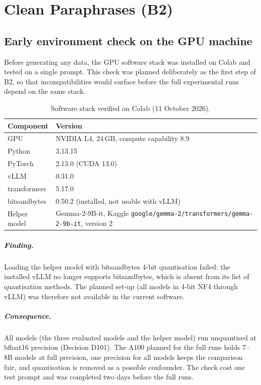\documentclass[11pt,a4paper]{report}
\begin{document}
\chapter{Clean Paraphrases (B2)}\label{ch:b2}

\section{Early environment check on the GPU machine}\label{sec:b2-envcheck}
Before generating any data, the GPU software stack was installed on Colab and
tested on a single prompt. This check was planned deliberately as the first
step of B2, so that incompatibilities would surface before the full
experimental runs depend on the same stack.

\begin{table}[h]
\centering\small
\begin{tabular}{@{}ll@{}}
\toprule
Component & Version \\
\midrule
GPU & NVIDIA L4, 24\,GB, compute capability 8.9 \\
Python & 3.13.15 \\
PyTorch & 2.13.0 (CUDA 13.0) \\
vLLM & 0.31.0 \\
transformers & 5.17.0 \\
bitsandbytes & 0.50.2 (installed, not usable with vLLM) \\
Helper model & Gemma-2-9B-it, Kaggle \texttt{google/gemma-2/transformers/gemma-2-9b-it}, version 2 \\
\bottomrule
\end{tabular}
\caption{Software stack verified on Colab (11 October 2026).}
\label{tab:b2-env}
\end{table}

\paragraph{Finding.}
Loading the helper model with bitsandbytes 4-bit quantisation failed: the
installed vLLM no longer supports bitsandbytes, which is absent from its list
of quantisation methods. The planned set-up (all models in 4-bit NF4 through
vLLM) was therefore not available in the current software.

\paragraph{Consequence.}
All models (the three evaluated models and the helper model) run unquantised
at bfloat16 precision (Decision D101). The A100 planned for the full runs holds
7--8B models at full precision, one precision for all models keeps the
comparison fair, and quantisation is removed as a possible confounder. The
check cost one test prompt and was completed two days before the full runs.
\end{document}
